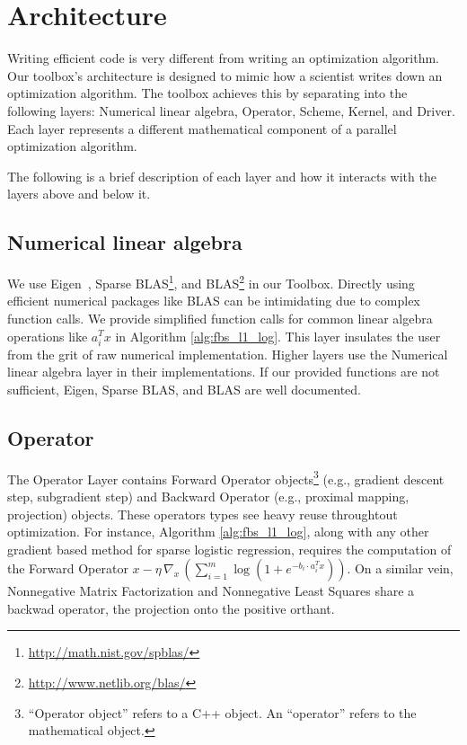 \section{Architecture}


Writing efficient code is very different from writing an optimization algorithm.
Our toolbox's architecture is designed to mimic how a scientist writes down an optimization algorithm.
The toolbox achieves this by separating into the following layers: Numerical linear algebra, Operator, Scheme, Kernel, and Driver.
Each layer represents a different mathematical component of a parallel optimization algorithm.


The following is a brief description of each layer and how it interacts with the layers above and below it. 

\subsection{Numerical linear algebra}

We use Eigen~\citep{eigenweb}, Sparse BLAS\footnote{\url{http://math.nist.gov/spblas/}}, and BLAS\footnote{\url{http://www.netlib.org/blas/}} in our Toolbox.
Directly using efficient numerical packages like BLAS can be intimidating due to complex function calls. We provide simplified function calls for common linear algebra operations like $a_i^T x$ in Algorithm \ref{alg:fbs_l1_log}. This layer insulates the user from the grit of raw numerical implementation. Higher layers use the Numerical linear algebra layer in their implementations.
If our provided functions are not sufficient, Eigen, Sparse BLAS, and BLAS are well documented. 

\subsection{Operator}

The Operator Layer contains Forward Operator objects\footnote{``Operator object'' refers to a C++ object. An ``operator'' refers to the mathematical object.} (e.g., gradient descent step, subgradient step) and Backward Operator (e.g., proximal mapping, projection) objects. These operators types see heavy reuse throughtout optimization.
For instance, Algorithm \ref{alg:fbs_l1_log}, along with any other gradient based method for sparse logistic regression, requires the computation of the Forward Operator $x - \eta \, \nabla_x \,(\sum_{i = 1}^m \log (1 + e^{-b_i \cdot a_i^T x}))$. On a similar vein, Nonnegative Matrix Factorization and Nonnegative Least Squares share a backwad operator, the projection onto the positive orthant.

